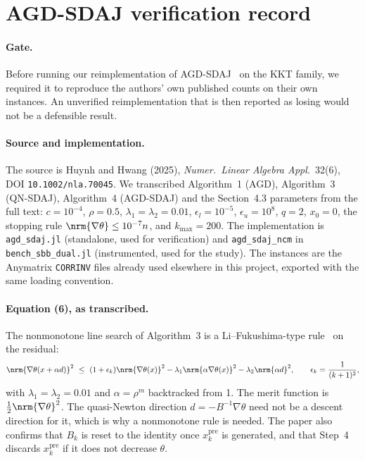 \section{AGD-SDAJ verification record}\label{app:agd}

\paragraph{Gate.}
Before running our reimplementation of AGD-SDAJ~\cite{huynh2025accelerated} on the
KKT family, we required it to reproduce the authors' own published counts on
their own instances. An unverified reimplementation that is then reported as
losing would not be a defensible result.

\paragraph{Source and implementation.}
The source is Huynh and Hwang (2025), \emph{Numer.\ Linear Algebra Appl.}\
32(6), DOI \texttt{10.1002/nla.70045}. We transcribed Algorithm~1 (AGD),
Algorithm~3 (QN-SDAJ), Algorithm~4 (AGD-SDAJ) and the Section~4.3 parameters
from the full text: $c=10^{-4}$, $\rho=0.5$, $\lambda_1=\lambda_2=0.01$,
$\epsilon_l=10^{-5}$, $\epsilon_u=10^{8}$, $q=2$, $x_0=0$, the stopping rule
$\nrm{\nabla\theta}\le10^{-7}n$, and $k_{\max}=200$. The implementation is
\texttt{agd\_sdaj.jl} (standalone, used for verification) and
\texttt{agd\_sdaj\_ncm} in \texttt{bench\_sbb\_dual.jl} (instrumented, used for
the study). The instances are the Anymatrix \texttt{CORRINV} files already used
elsewhere in this project, exported with the same loading convention.

\paragraph{Equation (6), as transcribed.}
The nonmonotone line search of Algorithm~3 is a Li--Fukushima-type
rule~\cite{li2000derivative} on the residual:
\begin{equation}\label{eq:hh6}
  \nrm{\nabla\theta(x+\alpha d)}^2\ \le\ (1+\epsilon_k)\nrm{\nabla\theta(x)}^2
  -\lambda_1\nrm{\alpha\nabla\theta(x)}^2-\lambda_2\nrm{\alpha d}^2,
  \qquad \epsilon_k=\frac{1}{(k+1)^2},
\end{equation}
with $\lambda_1=\lambda_2=0.01$ and $\alpha=\rho^m$ backtracked from 1. The
merit function is $\tfrac12\nrm{\nabla\theta}^2$. The quasi-Newton direction
$d=-B^{-1}\nabla\theta$ need not be a descent direction for it, which is why a
nonmonotone rule is needed. The paper also confirms that $B_k$ is reset to the
identity once $x_k^{\mathrm{pre}}$ is generated, and that Step~4 discards
$x_k^{\mathrm{pre}}$ if it does not decrease $\theta$.

